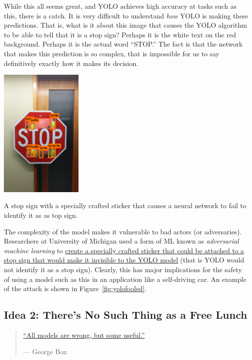 \documentclass[assignment01_Solutions]{subfiles}
\begin{document}
While this all seems great, and YOLO achieves high accuracy at tasks such as this, there is a catch.  It is very difficult to understand \emph{how} YOLO is making these predictions.  That is, what is it about this image that causes the YOLO algorithm to be able to tell that it is a stop sign?  Perhaps it is the white text on the red background.  Perhaps it is the actual word ``STOP.''  The fact is that the network that makes this prediction is so complex, that is impossible for us to say definitively exactly how it makes its decision.

\begin{marginfigure}
\includegraphics[width=1.6in]{figures/yolofooled}
\caption{A stop sign with a specially crafted sticker that causes a neural network to fail to identify it as as top sign.}\label{fig:yolofooled}
\end{marginfigure}
The complexity of the model makes it vulnerable to bad actors (or adversaries).  Researchers at University of Michigan used a form of ML known as \emph{adversarial machine learning} to \href{https://iotsecurity.engin.umich.edu/physical-adversarial-examples-for-object-detectors/}{create a specially crafted sticker that could be attached to a stop sign that would make it invisible to the YOLO model} (that is YOLO would not identify it as a stop sign).  Clearly, this has major implications for the safety of using a model such as this in an application like a self-driving car.   An example of the attach is shown in Figure~\ref{fig:yolofooled}.


\ei

\subsection*{Idea 2: There's No Such Thing as a Free Lunch}

\begin{quotation}
\href{https://en.wikipedia.org/wiki/All_models_are_wrong}{``All models are wrong, but some useful.''}

--- George Box
\end{quotation}
\end{document}
